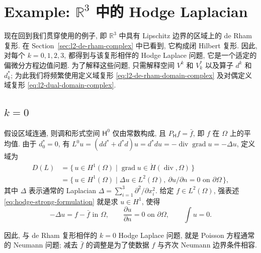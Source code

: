 \section{{Example: $\mathbb R^3$ 中的 Hodge Laplacian}}\label{sec:hodge-r3}

{现在回到我们贯穿使用的例子, 即 $\mathbb R^3$ 中具有 Lipschitz 边界的区域上的 de Rham 复形. 在 Section~\ref{sec:l2-de-rham-complex} 中已看到, 它构成闭 Hilbert 复形. 因此, 对每个 $k=0,1,2,3$, 都得到与该复形相伴的 Hodge Laplace 问题, 它是一个适定的偏微分方程边值问题. 为了解释这些问题, 只需解释空间 $V^k$ 和 $V_k^*$ 以及算子 $d^k$ 和 $d_k^*$; 为此我们将频繁使用定义域复形 \eqref{eq:l2-de-rham-domain-complex} 及对偶定义域复形 \eqref{eq:l2-dual-domain-complex}.}

\subsection{$k=0$}\label{subsec:hodge-r3-k0}

{假设区域连通, 则调和形式空间 $\mathsf H^0$ 仅由常数构成, 且 $P_{\mathsf H}f=\bar f$, 即 $f$ 在 $\Omega$ 上的平均值. 由于 $d_0^*=0$, 有 $L^0u=(dd^*+d^*d)u=d^*du=-\operatorname{div}\operatorname{grad}u=-\Delta u$, 定义域为}
\[
\begin{aligned}
D(L)&=\{\,u\in H^1(\Omega)\mid\operatorname{grad}u\in\mathring H(\operatorname{div},\Omega)\,\}\\
&=\{\,u\in H^1(\Omega)\mid\Delta u\in L^2(\Omega),\ \partial u/\partial n=0\text{ on }\partial\Omega\,\},
\end{aligned}
\]
{其中 $\Delta$ 表示通常的 Laplacian $\Delta=\sum_{i=1}^3\partial^2/\partial x_i^2$. 给定 $f\in L^2(\Omega)$, 强表述 \eqref{eq:hodge-strong-formulation} 就是求 $u\in H^1$, 使得}
\begin{equation}\label{eq:hodge-r3-neumann-strong}
-\Delta u=f-\bar f\text{ in }\Omega,\qquad\frac{\partial u}{\partial n}=0\text{ on }\partial\Omega,\qquad\int u=0.
\end{equation}

{因此, 与 de Rham 复形相伴的 $k=0$ Hodge Laplace 问题, 就是 Poisson 方程通常的 Neumann 问题; 减去 $\bar f$ 的调整是为了使数据 $f$ 与齐次 Neumann 边界条件相容.}

